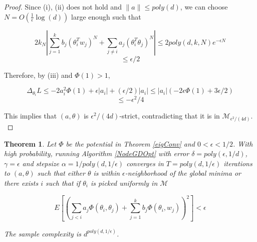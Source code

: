 \documentclass{article}
\newtheorem{theorem}{Theorem}[section]
\begin{document}
\begin{proof}
Since (i), (ii) does not hold and $\|a\| \leq poly(d)$, we can choose $N = O(\frac{1}{\epsilon}\log(d))$ large enough such that 

\[ 2k_N |\sum_{j=1}^k b_j (\theta_i^Tw_j)^N +  \sum_{j\neq i}  a_j(\theta_i^T\theta_j)^N| \leq  2poly(d,k,N)e^{-\epsilon N} \]
\[\leq \epsilon/2\] 

Therefore, by (iii) and $\Phi(1) > 1$,

\[\Delta_{\theta_i} L \leq -2a_i^2 \Phi(1) +\epsilon |a_i|+(\epsilon/2)|a_i| \leq |a_i|(-2\epsilon \Phi(1) + 3\epsilon/2) \]
\[\leq -\epsilon^2/4\]

This implies that $(a,\theta)$ is $\epsilon^2/(4d)$-strict, contradicting that it is in $\mathcal{M}_{\epsilon^2/(4d)}$. \\


\end{proof}


\begin{theorem}
Let $\Phi$ be the potential in Theorem \ref{eigConv} and $0 < \epsilon < 1/2$. With high probability, running Algorithm \ref{NodeGDOpt} with error $\delta = poly(\epsilon,1/d)$, $\gamma = \epsilon$ and stepsize $\alpha = 1/poly(d,1/\epsilon)$ converges in $T = poly(d, 1/\epsilon)$ iterations to $(a,\theta)$ such that either  $\theta$ is within $\epsilon$-neighborhood of the global minima or there exists $i$ such that if $\theta_i$ is picked uniformly in $\mathcal{M}$


\[ E\left[\left( \sum_{j < i} a_j \Phi(\theta_i,\theta_j) + \sum_{j=1}^k b_j \Phi(\theta_i,w_j)\right)^2\right] < \epsilon\]


The sample complexity is $d^{poly(d,1/\epsilon)}$.

\end{theorem}
\end{document}
